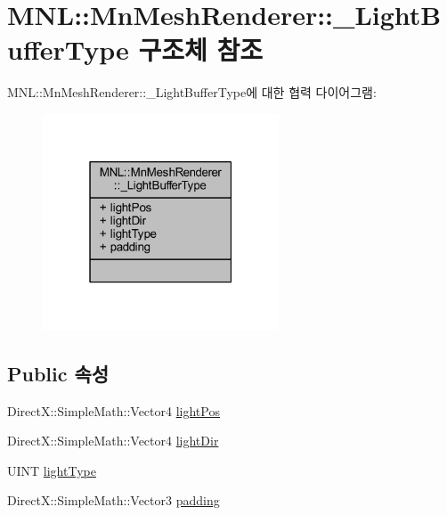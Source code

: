 \hypertarget{struct_m_n_l_1_1_mn_mesh_renderer_1_1___light_buffer_type}{}\section{M\+NL\+:\+:Mn\+Mesh\+Renderer\+:\+:\+\_\+\+Light\+Buffer\+Type 구조체 참조}
\label{struct_m_n_l_1_1_mn_mesh_renderer_1_1___light_buffer_type}


M\+NL\+:\+:Mn\+Mesh\+Renderer\+:\+:\+\_\+\+Light\+Buffer\+Type에 대한 협력 다이어그램\+:\nopagebreak
\begin{figure}[H]
\begin{center}
\leavevmode
\includegraphics[width=199pt]{struct_m_n_l_1_1_mn_mesh_renderer_1_1___light_buffer_type__coll__graph}
\end{center}
\end{figure}
\subsection*{Public 속성}
\begin{DoxyCompactItemize}
\item 
Direct\+X\+::\+Simple\+Math\+::\+Vector4 \hyperlink{struct_m_n_l_1_1_mn_mesh_renderer_1_1___light_buffer_type_aab3a0d88cba1db5892f6b9a1000e8e04}{light\+Pos}
\item 
Direct\+X\+::\+Simple\+Math\+::\+Vector4 \hyperlink{struct_m_n_l_1_1_mn_mesh_renderer_1_1___light_buffer_type_a1e79199e1f7cd6c1bdbf06fdc1741fb3}{light\+Dir}
\item 
U\+I\+NT \hyperlink{struct_m_n_l_1_1_mn_mesh_renderer_1_1___light_buffer_type_ab945d609e87caa088353041ec308251f}{light\+Type}
\item 
Direct\+X\+::\+Simple\+Math\+::\+Vector3 \hyperlink{struct_m_n_l_1_1_mn_mesh_renderer_1_1___light_buffer_type_a5f16d547a936d5c03125973a11167d01}{padding}
\end{DoxyCompactItemize}


